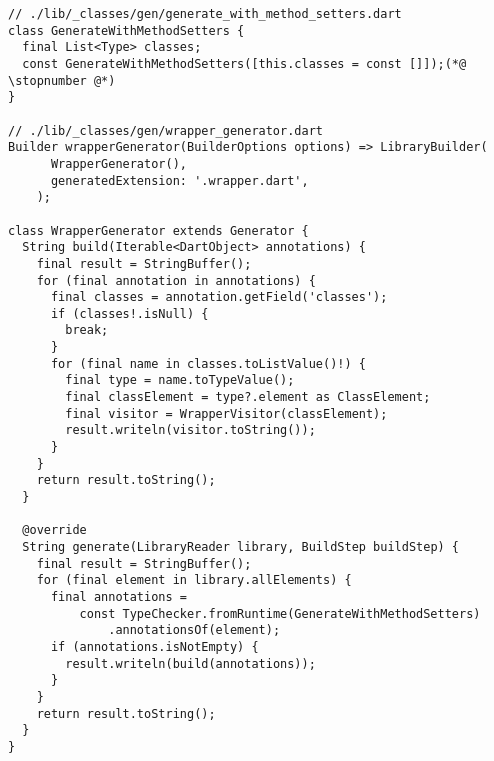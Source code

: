 \begin{lstlisting}
// ./lib/_classes/gen/generate_with_method_setters.dart
class GenerateWithMethodSetters {
  final List<Type> classes;
  const GenerateWithMethodSetters([this.classes = const []]);(*@ \stopnumber @*)
}

// ./lib/_classes/gen/wrapper_generator.dart
Builder wrapperGenerator(BuilderOptions options) => LibraryBuilder(
      WrapperGenerator(),
      generatedExtension: '.wrapper.dart',
    );

class WrapperGenerator extends Generator {
  String build(Iterable<DartObject> annotations) {
    final result = StringBuffer();
    for (final annotation in annotations) {
      final classes = annotation.getField('classes');
      if (classes!.isNull) {
        break;
      }
      for (final name in classes.toListValue()!) {
        final type = name.toTypeValue();
        final classElement = type?.element as ClassElement;
        final visitor = WrapperVisitor(classElement);
        result.writeln(visitor.toString());
      }
    }
    return result.toString();
  }

  @override
  String generate(LibraryReader library, BuildStep buildStep) {
    final result = StringBuffer();
    for (final element in library.allElements) {
      final annotations =
          const TypeChecker.fromRuntime(GenerateWithMethodSetters)
              .annotationsOf(element);
      if (annotations.isNotEmpty) {
        result.writeln(build(annotations));
      }
    }
    return result.toString();
  }
}
\end{lstlisting}
